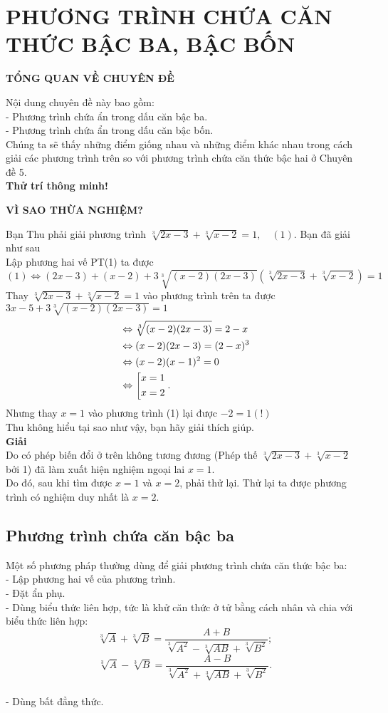 \section{PHƯƠNG TRÌNH CHỨA CĂN THỨC BẬC BA, BẬC BỐN}

\begin{center}
 \large \textbf{TỔNG QUAN VỀ CHUYÊN ĐỀ}
\end{center}
Nội dung chuyên đề này bao gồm:\\
- Phương trình chứa ẩn trong dấu căn bậc ba.\\
- Phương trình chứa ẩn trong dấu căn bậc bốn.\\
Chúng ta sẽ thấy những điểm giống nhau và những điểm khác nhau trong cách giải các phương trình trên so với phương trình chứa căn thức bậc hai ở Chuyên đề 5.\\
{\bf {Thử trí thông minh!}}\\
\begin{center}
	{\bf {VÌ SAO THỪA NGHIỆM?}}
\end{center}
Bạn Thu phải giải phương trình $\sqrt[3]{2x-3}+\sqrt[3]{x-2}=1,\quad (1).$ Bạn đã giải như sau\\ Lập phương hai vế PT(1) ta được
	$$ (1) \Leftrightarrow (2x-3)+(x-2) +3 \sqrt[3]{(x-2)(2x-3)} \left( \sqrt[3]{2x-3}+ \sqrt[3]{x-2}\right)=1$$
	Thay $\sqrt[3]{2x-3}+\sqrt[3]{x-2}=1$ vào phương trình trên ta được $3x-5+3\sqrt[3]{(x-2)(2x-3)}=1$ 
		\begin{align*}
		 &\Leftrightarrow \sqrt[3]{(x-2)(2x-3)}=2-x\\& \Leftrightarrow (x-2)(2x-3)=(2-x)^3\\& \Leftrightarrow (x-2)(x-1)^2=0\\& \Leftrightarrow \left[\begin{aligned}&x=1\\&x=2\end{aligned}\right..
		\end{align*}
Nhưng thay $x=1$ vào phương trình (1) lại được $-2=1 (!)$\\
Thu không hiểu tại sao như vậy, bạn hãy giải thích giúp.\\
{\bf{Giải}} \\
Do có phép biến đổi ở trên không tương đương (Phép thế $\sqrt[3]{2x-3}+\sqrt[3]{x-2}$ bởi 1) đã làm xuất hiện nghiệm ngoại lai $x=1$.\\
Do đó, sau khi tìm được $x=1$ và $x=2$, phải thử lại. Thử lại ta được phương trình có nghiệm duy nhất là $x=2.$

\subsection{Phương trình chứa căn bậc ba}
Một số phương pháp thường dùng để giải phương trình chứa căn thức bậc ba:\\
- Lập phương hai vế của phương trình.\\
- Đặt ẩn phụ.\\
- Dùng biểu thức liên hợp, tức là khử căn thức ở tử bằng cách nhân và chia với biểu thức liên hợp:\\
$$ \sqrt[3]{A}+\sqrt[3]{B}=\dfrac{A+B}{\sqrt[3]{A^2}- \sqrt[3]{AB}+\sqrt[3]{B^2}};
$$ $$ \sqrt[3]{A}-\sqrt[3]{B}=\dfrac{A-B}{\sqrt[3]{A^2}+ \sqrt[3]{AB}+\sqrt[3]{B^2}}.
$$ \\
- Dùng bất đẳng thức.


